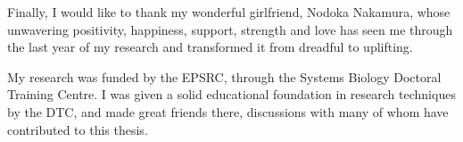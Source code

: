 Finally, I would like to thank my wonderful girlfriend, Nodoka Nakamura, whose unwavering positivity, happiness, support, strength and love has seen me through the last year of my research and transformed it from dreadful to uplifting.

My research was funded by the EPSRC, through the Systems Biology Doctoral Training Centre. I was given a solid educational foundation in research techniques by the DTC, and made great friends there, discussions with many of whom have contributed to this thesis.
